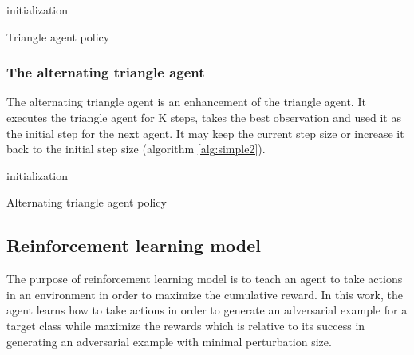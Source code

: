 \documentclass{article}
\begin{document}
\begin{algorithm}[H] \label{alg:simple}
\SetAlgoLined
{}
 initialization\;
 \caption{Triangle agent policy}
\end{algorithm}

\subsubsection{The alternating triangle agent}
The alternating triangle agent is an enhancement of the triangle agent. It executes the triangle agent for K steps, takes the best observation and used it as the initial step for the next agent. It may keep the current step size or increase it back to the initial step size (algorithm \ref{alg:simple2}).

\begin{algorithm}[H] \label{alg:simple2}
\SetAlgoLined
{}
 initialization\;
 \caption{Alternating triangle agent policy}
\end{algorithm}

\subsection{Reinforcement learning model}
The purpose of reinforcement learning model is to teach an agent to take actions in an environment in order to maximize the cumulative reward. In this work, the agent learns how to take actions in order to generate an adversarial example for a target class while maximize the rewards which is relative to its success in generating an adversarial example with minimal perturbation size.
\end{document}
